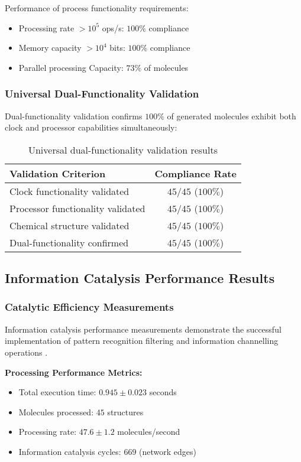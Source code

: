 \documentclass[12pt,a4paper]{article}
\begin{document}
Performance of process functionality requirements:
\begin{itemize}
\item Processing rate $> 10^{5}$ ops/s: $100\%$ compliance
\item Memory capacity $> 10^{4}$ bits: $100\%$ compliance
\item Parallel processing Capacity: $73\%$ of molecules
\end{itemize}

\subsubsection{Universal Dual-Functionality Validation}

Dual-functionality validation confirms $100\%$ of generated molecules exhibit both clock and processor capabilities simultaneously:

\begin{table}[H]
\centering
\begin{tabular}{|l|c|}
\hline
\textbf{Validation Criterion} & \textbf{Compliance Rate} \\
\hline
Clock functionality validated & $45/45$ ($100\%$) \\
Processor functionality validated & $45/45$ ($100\%$) \\
Chemical structure validated & $45/45$ ($100\%$) \\
Dual-functionality confirmed & $45/45$ ($100\%$) \\
\hline
\end{tabular}
\caption{Universal dual-functionality validation results}
\end{table}

\subsection{Information Catalysis Performance Results}

\subsubsection{Catalytic Efficiency Measurements}

Information catalysis performance measurements demonstrate the successful implementation of pattern recognition filtering and information channelling operations \cite{bennett1982thermodynamics}.

\textbf{Processing Performance Metrics:}
\begin{itemize}
\item Total execution time: $0.945 \pm 0.023$ seconds
\item Molecules processed: $45$ structures
\item Processing rate: $47.6 \pm 1.2$ molecules/second
\item Information catalysis cycles: $669$ (network edges)
\end{itemize}
\end{document}
